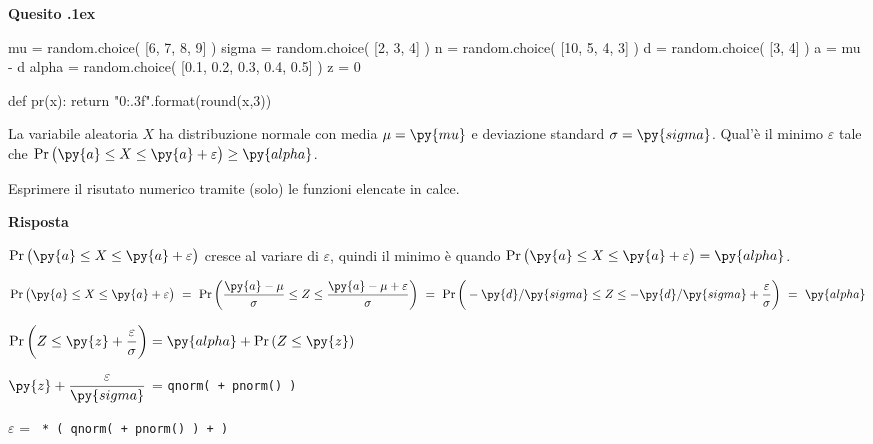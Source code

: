 \documentclass[11pt,twoside,a4paper]{article}
\def\Pr{{\rm Pr\,}}
\newcounter{quesito}
\newenvironment{question}{\addtocounter{quesito}{1}\bigskip\bigskip\par\textbf{Quesito \thequesito.\kern1ex}}{\vspace{\parskip}}
\newenvironment{answer}{\par\textbf{Risposta\quad}}{\vspace{\parskip}}
\begin{document}
\begin{question} %
\begin{pycode}
mu = random.choice( [6, 7, 8, 9] )
sigma = random.choice( [2, 3, 4] )
n = random.choice( [10, 5, 4, 3] )
d = random.choice( [3, 4] )
a = mu - d 
alpha = random.choice( [0.1, 0.2, 0.3, 0.4, 0.5] )
z = 0

def pr(x):
    return "{0:.3f}".format(round(x,3))
\end{pycode}
La variabile aleatoria $X$ ha distribuzione normale con media $\mu=\py{mu}$ e deviazione standard $\sigma=\py{sigma}$. Qual'è il minimo $\varepsilon$ tale che $\Pr\big(\py{a}\le X\le\py{a}+\varepsilon\big)\ge\py{alpha}$.

Esprimere il risutato numerico tramite (solo) le funzioni elencate in calce. 
\begin{answer}

$\Pr\big(\py{a}\le X\le\py{a}+\varepsilon\big)$ cresce al variare di $\varepsilon$, quindi il minimo è quando $\Pr\big(\py{a}\le X\le\py{a}+\varepsilon\big)=\py{alpha}$.

$\Pr\big(\py{a}\le X\le\py{a}+\varepsilon\big)
\ =\ 
\Pr\bigg(\dfrac{\py{a}-\mu}{\sigma}\le Z\le\dfrac{\py{a}-\mu+\varepsilon}{\sigma}\bigg)
\ =\ 
\Pr\bigg(-\py{d}/\py{sigma}\le Z\le-\py{d}/\py{sigma}+\dfrac{\varepsilon}{\sigma}\bigg)\ =\ \py{alpha}$

$\Pr\bigg(Z\le\py{z}+\dfrac{\varepsilon}{\sigma}\bigg) = +\Pr(Z\le{})$

$\py{z}+ \dfrac{\varepsilon}{}$ = {\tt  qnorm(  + pnorm() ) }

$\varepsilon$ = {\color{blue}\tt  \py{sigma} * ( qnorm( \py{alpha} + pnorm(\py{z})\ ) +  ) }

\end{answer}
\end{question}
\end{document}
